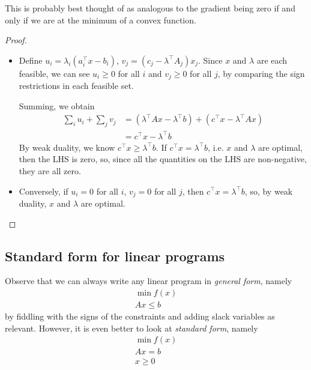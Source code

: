 \documentclass{../../template/note}
\begin{document}
    \begin{remark*}
        This is probably best thought of as analogous to the gradient being zero if and only if we are at the minimum of a convex function.
    \end{remark*}
    
    \begin{proof}
        \begin{itemize}
            \item [$\implies$] Define $u_i = \lambda_i (a_i^\intercal x - b_i)$, $v_j = (c_j - \lambda^\intercal A_j)x_j$. Since $x$ and $\lambda$ are each feasible, we can see $u_i \geq 0$ for all $i$ and $v_j \geq 0$ for all $j$, by comparing the sign restrictions in each feasible set.
            
            Summing, we obtain
            \begin{align*}
                \sum_i u_i + \sum_j v_j &= (\lambda^\intercal Ax - \lambda^\intercal b) + (c^\intercal x - \lambda^\intercal Ax) \\
                &= c^\intercal x - \lambda^\intercal b
            \end{align*}
            By weak duality, we know $c^\intercal x \geq \lambda^\intercal b$. If $c^\intercal x = \lambda^\intercal b$, i.e. $x$ and $\lambda$ are optimal, then the LHS is zero, so, since all the quantities on the LHS are non-negative, they are all zero.
            \item [$\impliedby$] Conversely, if $u_i = 0$ for all $i$, $v_j = 0$ for all $j$, then $c^\intercal x = \lambda^\intercal b$, so, by weak duality, $x$ and $\lambda$ are optimal.            
        \end{itemize}
    \end{proof}
    
    \subsection{Standard form for linear programs}

    Observe that we can always write any linear program in \emph{general form}, namely
    \begin{align*}
        \min f(x) \\
        Ax \leq b
    \end{align*}
    by fiddling with the signs of the constraints and adding slack variables as relevant. However, it is even better to look at \emph{standard form}, namely
    \begin{align*}
        \min f(x) \\
        Ax = b \\
        x \geq 0
    \end{align*}
    
\end{document}
